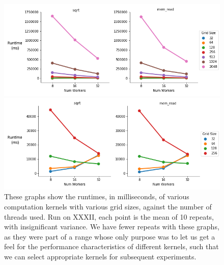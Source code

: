 \begin{figure}[H]
    \centerline{\includegraphics[width=1\textwidth]{graphics/interesting_instances/focustest2_1.png}}
    \centerline{\includegraphics[width=1\textwidth]{graphics/interesting_instances/focustest2_2.png}}
    \caption{These graphs show the runtimes, in milliseconds, of various computation kernels with various grid sizes, against the number of threads used. Run on XXXII, each point is the mean of 10 repeats, with insignificant variance. We have fewer repeats with these graphs, as they were part of a range whose only purpose was to let us get a feel for the performance characteristics of different kernels, such that we can select appropriate kernels for subsequent experiments.}
    \label{fig:focustest2}
\end{figure}



